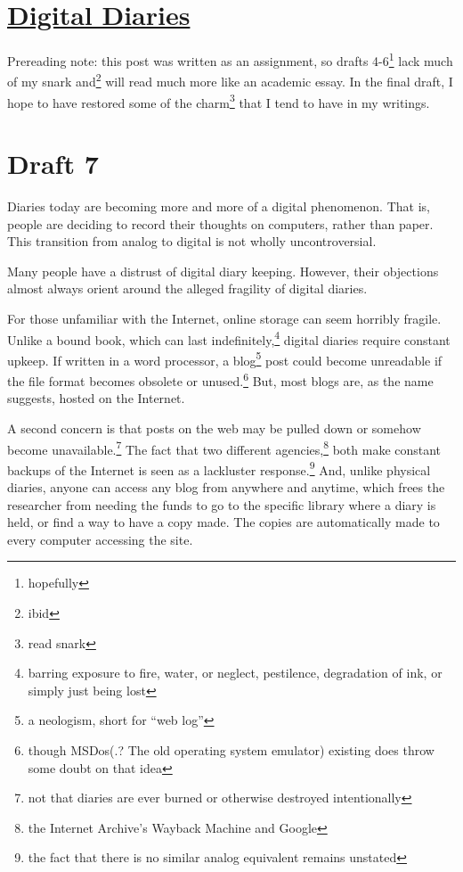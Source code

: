 \documentclass[12pt]{article}[titlepage]
\newcommand{\say}[1]{``#1''}
\newcommand{\1}{\={a}}
\newcommand{\2}{\={e}}
\newcommand{\3}{\={\i}}
\newcommand{\4}{\=o}
\newcommand{\5}{\=u}
\newcommand{\6}{\={A}}
\renewcommand{\,}{\textsuperscript{,}}
\begin{document}
\doublespacing
\section{\href{digital-diaries.html}{Digital Diaries}}
Prereading note: this post was written as an assignment, so drafts 4-6\footnote{hopefully} lack much of my snark and\footnote{ibid} will read much more like an academic essay.
In the final draft, I hope to have restored some of the charm\footnote{read snark} that I tend to have in my writings.

\section{Draft 7}
Diaries today are becoming more and more of a digital phenomenon.
That is, people are deciding to record their thoughts on computers, rather than paper.
This transition from analog to digital is not wholly uncontroversial.

Many people have a distrust of digital diary keeping.
However, their objections almost always orient around the alleged fragility of digital diaries.

For those unfamiliar with the Internet, online storage can seem horribly fragile.
Unlike a bound book, which can last indefinitely,\footnote{barring exposure to fire, water, or neglect, pestilence, degradation of ink, or simply just being lost} digital diaries require constant upkeep.
If written in a word processor, a blog\footnote{a neologism, short for \say{web log}} post could become unreadable if the file format becomes obsolete or unused.\footnote{though MSDos(.? The old operating system emulator) existing does throw some doubt on that idea}
But, most blogs are, as the name suggests, hosted on the Internet.

A second concern is that posts on the web may be pulled down or somehow become unavailable.\footnote{not that diaries are ever burned or otherwise destroyed intentionally}
The fact that two different agencies,\footnote{the Internet Archive’s Wayback Machine and Google} both make constant backups of the Internet is seen as a lackluster response.\footnote{the fact that there is no similar analog equivalent remains unstated}
And, unlike physical diaries, anyone can access any blog from anywhere and anytime, which frees the researcher from needing the funds to go to the specific library where a diary is held, or find a way to have a copy made.
The copies are automatically made to every computer accessing the site.
\end{document}
